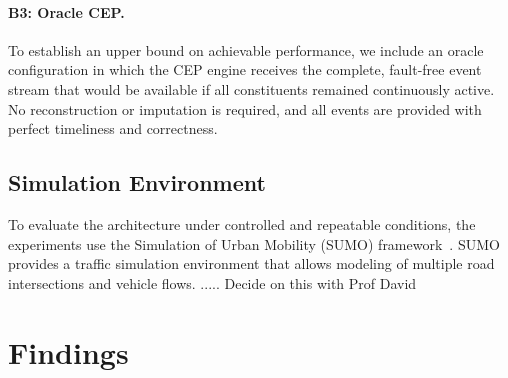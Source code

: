 \paragraph{B3: Oracle CEP.}
To establish an upper bound on achievable performance, we include an oracle configuration in which the CEP engine receives the complete, fault-free event stream that would be available if all constituents remained continuously active. 
No reconstruction or imputation is required, and all events are provided with perfect timeliness and correctness. 


\subsection{Simulation Environment}\label{subsec:results-eval-simulation-env}
To evaluate the architecture under controlled and repeatable conditions, the experiments use the Simulation of Urban Mobility (SUMO) framework~\cite{krajzewicz2012recent}. SUMO provides a traffic simulation environment that allows modeling of multiple road intersections and vehicle flows. 
.....
Decide on this with Prof David


\section{Findings}\label{sec:results-res}



